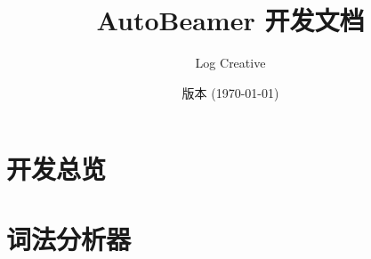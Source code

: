 \documentclass{ctexrep}
\begin{document}
    \title{\textsf{AutoBeamer} \textbf{开发文档}}
    \author{Log Creative}
    \date{版本  (\today)}
    \maketitle
    \tableofcontents

    \chapter{开发总览}

    

    \chapter{词法分析器}

    
\end{document}
